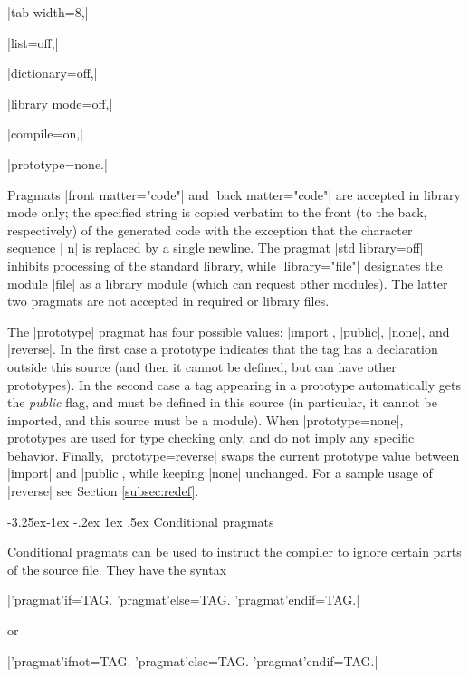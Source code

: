 \documentclass[titlepage]{article}
\makeatletter
\newcommand\g[1]{\textsf{\color{blue!90!black}#1}}
\renewcommand\subsection{%
\@startsection{subsection}{2}{\z@}%
   {-3.25ex\@plus -1ex \@minus -.2ex}%
   {1ex \@plus .5ex}%
   {\normalfont\normalsize\bfseries}}
\makeatother
\begin{document}
\HH\pp|tab width=8,|\HE

\HH\pp|list=off,|\HE

\HH\pp|dictionary=off,|\HE

\HH\pp|library mode=off,|\HE

\HH\pp|compile=on,|\HE

\HH\pp|prototype=none.|\HE

\smallskip
Pragmats \pp|front matter="code"|  and \pp|back matter="code"| are accepted
in library mode only; the specified string is copied verbatim to the front
(to the back, respectively) of the generated code with the exception that
the character sequence \pp| n| is replaced by a single newline. The
pragmat \pp|std
library=off| inhibits processing of the standard library, while
\pp|library="file"| designates the module \pp|file| as a library module
(which can request other modules). The latter two pragmats are not accepted
in required or library files.

The \pp|prototype| pragmat has four possible values: \pp|import|,
\pp|public|, \pp|none|, and \pp|reverse|. In the first case a \g{prototype}
indicates that the tag has a declaration outside this source (and then it
cannot be defined, but can have other prototypes). In the second case a tag
appearing in a \g{prototype} automatically gets the \emph{public} flag, and
must be defined in this source (in particular, it cannot be imported, and
this source must be a module). When
\pp|prototype=none|, prototypes are used for type checking only, and do
not imply any specific behavior. Finally, \pp|prototype=reverse| swaps the
current prototype value between \pp|import| and \pp|public|, while keeping
\pp|none| unchanged. For a sample usage of \pp|reverse| see Section
 \ref{subsec:redef}.


\subsection{Conditional pragmats}\label{conditional}

Conditional pragmats can be used to instruct the compiler to ignore certain
parts of the source file. They have the syntax

\medskip

\pp|'pragmat'if=TAG.     'pragmat'else=TAG.   'pragmat'endif=TAG.|

\noindent or

\pp|'pragmat'ifnot=TAG.  'pragmat'else=TAG.   'pragmat'endif=TAG.|
\end{document}
